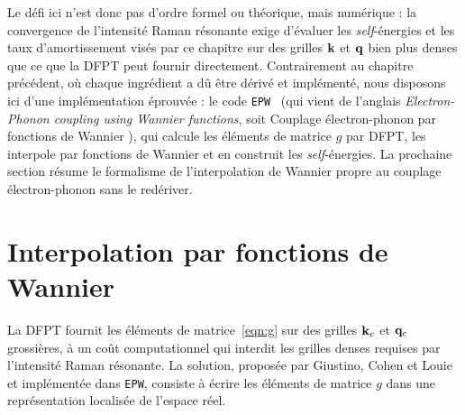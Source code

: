 Le défi ici n'est donc pas d'ordre formel ou théorique, mais numérique : la convergence de l'intensité Raman résonante exige d'évaluer les \textit{self}-énergies et les taux d'amortissement visés par ce chapitre sur des grilles $\mathbf{k}$ et $\mathbf{q}$ bien plus denses que ce que la DFPT peut fournir directement. Contrairement au chapitre précédent, où chaque ingrédient a dû être dérivé et implémenté, nous disposons ici d'une implémentation éprouvée : le code \texttt{EPW}~\cite{ponceEPWElectronphononCoupling2016,leeElectronPhononPhysics2023a} (qui vient de l'anglais \textit{Electron-Phonon coupling using Wannier functions}, soit \og Couplage électron-phonon par fonctions de Wannier \fg{}), qui calcule les éléments de matrice $g$ par DFPT, les interpole par fonctions de Wannier et en construit les \textit{self}-énergies. La prochaine section résume le formalisme de l'interpolation de Wannier propre au couplage électron-phonon sans le redériver.

\section{Interpolation par fonctions de Wannier}\label{sec:g_wannier}

La DFPT fournit les éléments de matrice~\eqref{eqn:g} sur des grilles $\mathbf{k}_c$ et $\mathbf{q}_c$ grossières, à un coût computationnel qui interdit les grilles denses requises par l'intensité Raman résonante. La solution, proposée par Giustino, Cohen et Louie~\cite{giustinoElectronphononInteractionUsing2007} et implémentée dans \texttt{EPW}, consiste à écrire les éléments de matrice $g$ dans une représentation localisée de l'espace réel.

